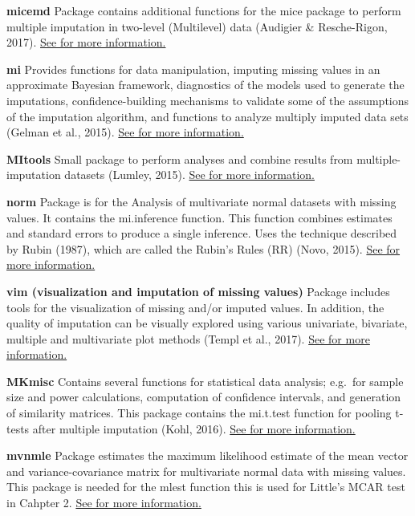\documentclass[
]{book}
\begin{document}
\textbf{micemd}
Package contains additional functions for the mice package to perform multiple imputation in two-level (Multilevel) data (Audigier \& Resche-Rigon, 2017).
\href{https://cran.r-project.org/web/packages/micemd/index.html}{See for more information.}

\textbf{mi}
Provides functions for data manipulation, imputing missing values in an approximate Bayesian framework, diagnostics of the models used to generate the imputations, confidence-building mechanisms to validate some of the assumptions of the imputation algorithm, and functions to analyze multiply imputed data sets (Gelman et al., 2015).
\href{https://cran.r-project.org/web/packages/mi/index.html}{See for more information.}

\textbf{MItools}
Small package to perform analyses and combine results from multiple-imputation datasets (Lumley, 2015).
\href{https://cran.r-project.org/web/packages/mitools/index.html}{See for more information.}

\textbf{norm}
Package is for the Analysis of multivariate normal datasets with missing values. It contains the mi.inference function. This function combines estimates and standard errors to produce a single inference. Uses the technique described by Rubin (1987), which are called the Rubin's Rules (RR) (Novo, 2015).
\href{https://cran.r-project.org/web/packages/norm/index.html}{See for more information.}

\textbf{vim (visualization and imputation of missing values)}
Package includes tools for the visualization of missing and/or imputed values. In addition, the quality of imputation can be visually explored using various univariate, bivariate, multiple and multivariate plot methods (Templ et al., 2017).
\href{https://cran.r-project.org/web/packages/mi/index.html}{See for more information.}

\textbf{MKmisc}
Contains several functions for statistical data analysis; e.g.~for sample size and power calculations, computation of confidence intervals, and generation of similarity matrices. This package contains the mi.t.test function for pooling t-tests after multiple imputation (Kohl, 2016).
\href{https://cran.r-project.org/web/packages/MKmisc/index.html}{See for more information.}

\textbf{mvnmle}
Package estimates the maximum likelihood estimate of the mean vector and variance-covariance matrix for multivariate normal data with missing values. This package is needed for the mlest function this is used for Little's MCAR test in Cahpter 2.
\href{https://cran.r-project.org/web/packages/mvnmle/index.html}{See for more information.}
\end{document}
